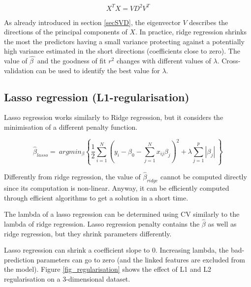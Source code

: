 \begin{equation}
X^TX=VD^2V^T
\label{eq_ridgeRegression5}
\end{equation}

As already introduced in section \ref{secSVD}, the eigenvector $V$ describes the directions of the principal components of $X$. In practice, ridge regression shrinks the most the predictors having a small variance protecting against a potentially high variance estimated in the short directions (coefficients close to zero). The value of $\widehat{\beta\ }$ and the goodness of fit $r^2$ changes with different values of $\lambda$. Cross-validation can be used to identify the best value for $\lambda$.

\subsection{Lasso regression (L1-regularisation)} \label{secLassoRegression}
Lasso regression works similarly to Ridge regression, but it considers the minimisation of a different penalty function.

\begin{equation}
{\hat{\beta}}_{lasso}=\ argmin_\beta{\left\{\frac{1}{2}\sum_{i=1}^{N}\left(y_i-\beta_0-\sum_{j=1}^{N}{x_{ij}\beta_j}\right)^2+\lambda\sum_{j=1}^{p}{|\beta_j|}\ \right\}}
\label{eq_lasso1}
\end{equation}

Differently from ridge regression, the value of ${\hat{\beta}}_{ridge}$ cannot be computed directly since its computation is non-linear. Anyway, it can be efficiently computed through efficient algorithms to get a solution in a short time.\par

The lambda of a lasso regression can be determined using CV similarly to the lambda of ridge regression. Lasso regression penalty contains the $\hat{\beta}$ as well as ridge regression, but they shrink parameters differently.\par

Lasso regression can shrink a coefficient slope to 0. Increasing lambda, the bad-prediction parameters can go to zero (and the linked features are excluded from the model). Figure \ref{fig_regularisation} shows the effect of L1 and L2 regularisation on a 3-dimensional dataset.

